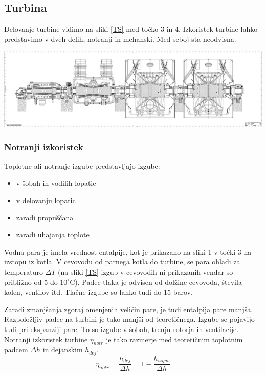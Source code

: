 \documentclass[a4paper,10pt]{article}
\begin{document}
\begin{multicols}{2}
\subsection{Turbina}
Delovanje turbine vidimo na sliki \ref{TS} med točko 3 in 4. Izkoristek turbine lahko predstavimo v dveh delih, notranji in mehanski. Med seboj sta neodvisna.\citep{Katebi}
\begin{minipage}{\linewidth}
	\includegraphics[width=\columnwidth]{prerez-turbina-bloka-6.png}
	\label{sostanj}
\end{minipage}
\subsubsection{Notranji izkoristek}
Toplotne ali notranje izgube predstavljajo izgube:
\begin{itemize}
	\item v šobah in vodilih lopatic 
	\item	v delovanju lopatic 
	\item	zaradi propuščana 
	\item	zaradi uhajanja toplote 

\end{itemize}
Vodna para je imela vrednost entalpije, kot je prikazano na sliki 1 v točki 3 na izstopu iz kotla. V cevovodu od parnega kotla do turbine, se para ohladi za temperaturo $\Delta T$ (na sliki \ref{TS} izgub v cevovodih ni prikazanih vendar so približno od 5 do $10^\circ \mathrm{C}$). Padec tlaka je odvisen od dolžine cevovoda, števila kolen, ventilov itd. Tlačne izgube so lahko tudi do 15 barov. 

Zaradi zmanjšanja zgoraj omenjenih veličin pare, je tudi entalpija pare manjša. Razpoložljiv padec na turbini je tako manjši od teoretičnega. Izgube se pojavijo tudi pri ekspanziji pare. To so izgube v šobah, trenju rotorja in ventilacije.  Notranji izkoristek turbine $\eta_{notr}$ je tako razmerje med teoretičnim toplotnim padcem $\Delta h$ in dejanskim $h_{dej}$. \citep{Orel}
\begin{equation}
	\eta_{notr}= \frac{h_{dej}}{\Delta h} =1- \frac{h_{izgub}}{\Delta h}
\end{equation}

\end{multicols}
\end{document}
